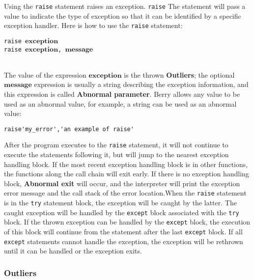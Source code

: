 Using the \texttt{raise} statement raises an exception. \texttt{raise} The statement will pass a value to indicate the type of exception so that it can be identified by a specific exception handler. Here is how to use the \texttt{raise} statement:
\begin{algorithm}
    \texttt{raise }$\bm{exception}$ \\
    \texttt{raise }$\bm{exception}$\texttt{, }$\bm{message}$
\end{algorithm}\vspace{-0.6em}\\
The value of the expression $\bm{exception}$ is the thrown \textbf{Outliers}; the optional $\bm{message}$ expression is usually a string describing the exception information, and this expression is called \textbf{Abnormal parameter}. Berry allows any value to be used as an abnormal value, for example, a string can be used as an abnormal value:
\begin{lstlisting}[language=berry, numbers=none]
raise'my_error','an example of raise'
\end{lstlisting}

After the program executes to the \texttt{raise} statement, it will not continue to execute the statements following it, but will jump to the nearest exception handling block. If the most recent exception handling block is in other functions, the functions along the call chain will exit early. If there is no exception handling block, \textbf{Abnormal exit} will occur, and the interpreter will print the exception error message and the call stack of the error location.When the \texttt{raise} statement is in the \texttt{try} statement block, the exception will be caught by the latter. The caught exception will be handled by the \texttt{except} block associated with the \texttt{try} block. If the thrown exception can be handled by the \texttt{except} block, the execution of this block will continue from the statement after the last \texttt{except} block. If all \texttt{except} statements cannot handle the exception, the exception will be rethrown until it can be handled or the exception exits.

\subsubsection {Outliers}

